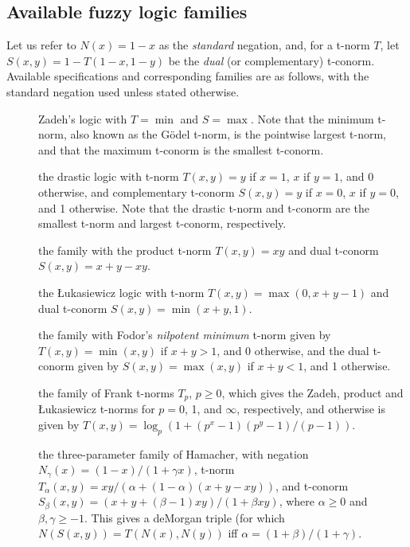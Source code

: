 \documentclass[article]{jss}
\newcommand{\eqn}[1]{$#1$}
\begin{document}
\begin{appendix}

\section{Available fuzzy logic families}
\label{sec:fuzzyfamilies}

  Let us
  refer to \eqn{N(x) = 1 - x} as the \emph{standard} negation, and,
  for a t-norm \eqn{T}, let \eqn{S(x, y) = 1 - T(1 - x, 1 - y)} be the
  \emph{dual} (or complementary) t-conorm.  Available specifications and
  corresponding families are as follows, with the standard negation used
  unless stated otherwise.

  \begin{description}
    \item[]{Zadeh's logic with \eqn{T = \min} and
      \eqn{S = \max}.  Note that the minimum t-norm, also known as the
      G{\"o}del t-norm, is the pointwise largest t-norm, and that the
      maximum t-conorm is the smallest t-conorm.}
    \item[]{the drastic logic with t-norm
      \eqn{T(x, y) = y} if \eqn{x = 1}, \eqn{x} if \eqn{y = 1}, and 0
      otherwise, and complementary t-conorm \eqn{S(x, y) = y} if
      \eqn{x = 0}, \eqn{x} if \eqn{y = 0}, and 1 otherwise.  Note that
      the drastic t-norm and t-conorm are the smallest t-norm and
      largest t-conorm, respectively.}
    \item[]{the family with the product t-norm
      \eqn{T(x, y) = xy} and dual t-conorm \eqn{S(x, y) = x + y - xy}.}
    \item[]{the \L{}ukasiewicz logic with t-norm
      \eqn{T(x, y) = \max(0, x + y - 1)} and dual t-conorm
      \eqn{S(x, y) = \min(x + y, 1)}.}
    \item[]{the family with Fodor's \emph{nilpotent
	minimum} t-norm given by \eqn{T(x, y) = \min(x, y)} if
      \eqn{x + y > 1}, and 0 otherwise, and the dual t-conorm given by
    \eqn{S(x, y) = \max(x, y)} if \eqn{x + y < 1}, and 1 otherwise.}
    \item[]{the family of Frank t-norms \eqn{T_p},
      \eqn{p \ge 0}, which gives the Zadeh, product and \L{}ukasiewicz
      t-norms for \eqn{p = 0}, 1, and \eqn{\infty}, respectively,
      and otherwise is given by
      \eqn{T(x, y) = \log_p (1 + (p^x - 1) (p^y - 1) / (p - 1))}.}
    \item[]{the three-parameter family of Hamacher,
      with negation \eqn{N_\gamma(x) = (1 - x) / (1 + \gamma x)},
      t-norm  \eqn{T_\alpha(x, y) = xy / (\alpha + (1 - \alpha)(x + y - xy))},
      and t-conorm
      \eqn{S_\beta(x, y) = (x + y + (\beta - 1) xy) / (1 + \beta xy)},
      where \eqn{\alpha \ge 0} and \eqn{\beta, \gamma \ge -1}.  This
      gives a deMorgan triple (for which $N(S(x, y)) = T(N(x), N(y))$
      iff \eqn{\alpha = (1 + \beta) / (1 + \gamma)}.}
  \end{description}


\end{appendix}
\end{document}
